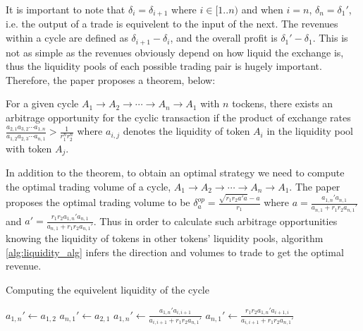 It is important to note that $\delta_i = \delta_{i+1}$ where $i \in [1..n)$ and when $i = n$, $\delta_n = \delta_{1}'$, i.e. the output of a trade is equivelent to the input of the next. The revenues within a cycle are defined as $\delta_{i+1} - \delta_i$, and the overall profit is $\delta_{1}' - \delta_1$. This is not as simple as the revenues obviously depend on how liquid the exchange is, thus the liquidity pools of each possible trading pair is hugely important. Therefore, the paper proposes a theorem, below:

\begin{theorem}
    For a given cycle $A_1 \rightarrow A_2 \rightarrow \cdots \rightarrow A_n \rightarrow A_1$ with $n$ tockens, there exists an arbitrage opportunity for the cyclic transaction if the product of exchange rates $\frac{a_{2,1}a_{3,2}\cdots a_{1,n}}{a_{1,2}a_{2,3}\cdots a_{n, 1}} > \frac{1}{r_1^n r_2^n}$ where $a_{i,j}$ denotes the liquidity of token $A_i$ in the liquidity pool with token $A_j$.~\cite{wang_cyclic_2022}
\end{theorem}

In addition to the theorem, to obtain an optimal strategy we need to compute the optimal trading volume of a cycle, $A_1 \rightarrow A_2 \rightarrow \cdots \rightarrow A_n \rightarrow A_1$. The paper proposes the optimal trading volume to be $\delta^{op}_a = \frac{\sqrt{r_1 r_2 a' a} - a}{r_1}$ where $a = \frac{a_{1,n}'a_{n,1}}{a_{n,1}+r_1 r_2 a_{n,1}'}$ and $a' = \frac{r_1 r_2 a_{1,n}'a_{n,1}}{a_{n,1}+r_1 r_2 a_{n,1}'}$. Thus in order to calculate such arbitrage opportunities knowing the liquidity of tokens in other tokens' liquidity pools, algorithm \ref{alg:liquidity_alg} infers the direction and volumes to trade to get the optimal revenue.

\begin{algorithm}
    \caption{Computing the equivelent liquidity of the cycle}\label{alg:liquidity_alg}
    \begin{algorithmic}
        \State $a_{1, n}' \leftarrow a_{1,2}$
        \State $a_{n, 1}' \leftarrow a_{2,1}$
            \State $a_{1, n}' \leftarrow \frac{a_{1,n}'a_{i,i+1}}{a_{i,i+1}+r_1 r_2 a_{n,1}'}$
            \State $a_{n, 1}' \leftarrow \frac{r_1 r_2 a_{1,n}'a_{i+1, i}}{a_{i,i+1}+r_1 r_2 a_{n,1}'}$
        \EndFor
    \end{algorithmic}
\end{algorithm}

